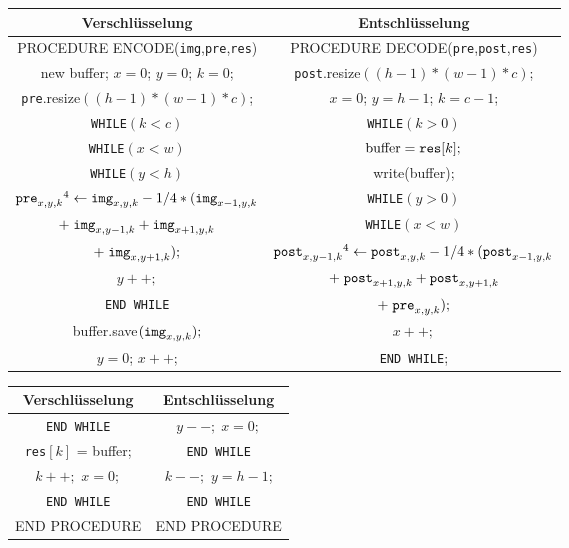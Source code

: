 \documentclass[a4paper,12pt]{article}
\begin{document}
\begin{tabular}{c|c}
Verschlüsselung & Entschlüsselung
\\
\hline
PROCEDURE ENCODE({\tt{img}},{\tt{pre}},{\tt{res}}) & PROCEDURE DECODE({\tt{pre}},{\tt{post}},{\tt{res}})
\\
new buffer; $x=0$; $y=0$; $k=0$; & {\tt{post}}.resize$((h-1)*(w-1)*c)$;
\\
{\tt{pre}}.resize$((h-1)*(w-1)*c)$; & $x=0$; $y=h-1$; $k=c-1$;
\\
{\tt{WHILE}}$(k < c)$ &                  {\tt{WHILE}}$(k > 0)$
\\
{\tt{WHILE}}$(x < w)$ &               $\text{buffer} = \text{{\tt{res}}}[k];$
\\
{\tt{WHILE}}$(y < h)$ &            write(buffer);
\\
$\text{{\tt{pre}}}_{x,y,k}\footnotemark[4]\leftarrow \text{{\tt{img}}}_{x,y,k} - 1/4 *(\text{{\tt{img}}}_{x-1,y,k}$ & {\tt{WHILE}}$(y > 0)$ 
\\
$+\;\text{{\tt{img}}}_{x,y-1,k} + \text{{\tt{img}}}_{x+1,y,k}$  &  {\tt{WHILE}}$(x<w)$
\\
$+\;\text{{\tt{img}}}_{x,y+1,k});$ & $\text{{\tt{post}}}_{x,y-1,k}\footnotemark[4]\leftarrow \text{{\tt{post}}}_{x,y,k} - 1/4 *(\text{{\tt{post}}}_{x-1,y,k} $ 
\\
$y++;$ &   $+\;\text{{\tt{post}}}_{x+1,y,k}  + \text{{\tt{post}}}_{x,y+1,k}$  
\\
{\tt{END {\tt{WHILE}}}}  & $+\;\text{{\tt{pre}}}_{x,y,k});$
\\
buffer.save$(\text{{\tt{img}}}_{x,y,k});$  & $x++;$
\\
$y=0$; $x++$;  &   {\tt{END {\tt{WHILE}}}}; 
\end{tabular}
\begin{center}
\begin{tabular}{c|c}
Verschlüsselung & Entschlüsselung
\\
\hline
{\tt{END {\tt{WHILE}}}}   & $y--;\;x=0;$ 
\\
{\tt{res}}$[k]$ = buffer;  &  {\tt{END {\tt{WHILE}}}} 
\\
$k++;$ $x=0;$   &   $k--;$ $y=h-1$;
\\
{\tt{END {\tt{WHILE}}}} & {\tt{END {\tt{WHILE}}}} 
\\
END PROCEDURE & END PROCEDURE
\end{tabular}
\end{center}
\end{document}
